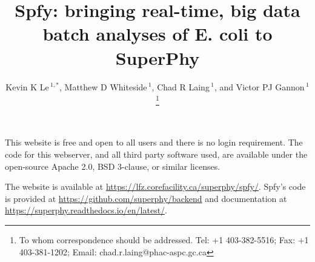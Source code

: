 \documentclass[a4paper, onecolumn]{NAR}
\begin{document}
\title{Spfy: bringing real-time, big data batch analyses of E. coli to SuperPhy}

\author{%
Kevin K Le\,$^{1, *}$,
Matthew D Whiteside\,$^{1}$,
Chad R Laing\,$^{1}$,
and Victor PJ Gannon\,$^{1}$
\footnote{To whom correspondence should be addressed.
Tel: +1 403-382-5516; Fax: +1 403-381-1202; Email: chad.r.laing@phac-aspc.gc.ca}}

\address{%
$^{1}$Laboratory for Foodborne Zoonoses, Public Health Agency of Canada, Twp Rd 9-1, Lethbridge, AB, T1J 3Z4, Canada}

\maketitle


This website is free and open to all users and there is no login requirement. The code for this webserver, and all third party software used, are available under the open-source Apache 2.0, BSD 3-clause, or similar licenses. \par

The website is available at \url{https://lfz.corefacility.ca/superphy/spfy/}. Spfy's code is provided at \url{https://github.com/superphy/backend} and documentation at \url{https://superphy.readthedocs.io/en/latest/}. \par
\end{document}
